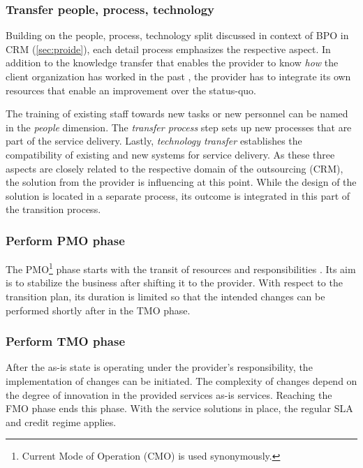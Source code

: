 	\subsubsection{Transfer people, process, technology}
	
	Building on the people, process, technology split discussed in context of  \acrshort{BPO} in \acrshort{CRM} (\cf \ref{sec:proide}), each detail process emphasizes the respective aspect. In addition to the knowledge transfer that enables the provider to know \textit{how} the client organization has worked in the past \citep{perunovic2007outsourcing}, the provider has to integrate its own resources that enable an improvement over the status-quo.
	
	The training of existing staff towards new tasks or new personnel can be named in the \textit{people} dimension. The \textit{transfer process} step sets up new processes that are part of the service delivery. Lastly, \textit{technology transfer} establishes the compatibility of existing and new systems for service delivery. As these three aspects are closely related to the respective domain of the outsourcing (\viz \acrshort{CRM}), the solution from the provider is influencing at this point. While the design of the solution is located in a separate process, its outcome is integrated in this part of the transition process. 
	
	\subsubsection{Perform \acrshort{PMO} phase}
	The \acrshort{PMO}\footnote{Current Mode of Operation (CMO) is used synonymously. } phase starts with the transit of resources and responsibilities \citep{bitkom2008}. Its aim is to stabilize the business after shifting it to the provider. With respect to the transition plan, its duration is limited so that the intended changes can be performed shortly after in the \acrshort{TMO} phase.
	
	\subsubsection{Perform \acrshort{TMO} phase}
	After the as-is state is operating under the provider's responsibility, the implementation of changes can be initiated. The complexity of changes depend on the degree of innovation in the provided services \wrt as-is services. Reaching the \acrshort{FMO} phase ends this phase. With the service solutions in place, the regular \acrshort{SLA} and credit regime applies.
	

